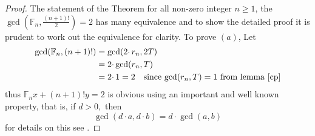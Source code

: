 \documentclass[pdflatex,sn-mathphys-num]{sn-jnl}%
\theoremstyle{thmstyleone}%
\theoremstyle{thmstyletwo}%
\theoremstyle{thmstylethree}%
\begin{document}
\begin{proof}
The statement of the Theorem for all non-zero integer $n\geq 1$, the $\gcd(\mathbb{F}_{n},\frac{(n+1)!}{2})=2$ has many equivalence and to show the detailed proof it is prudent to work out the equivalence for clarity. 
To prove $(a)$, Let 
\begin{align*}
    \gcd(\mathbb{F}_{n},(n+1)!)&=\gcd(2\cdotp r_{n},2T)\\
    &=2\cdotp \gcd(r_n, T) \\
    &=2 \cdotp 1= 2 \quad \mbox{since $\gcd(r_n, T)=1$ from lemma \ref{cp}}
\end{align*}
thus $\mathbb{F}_{n} x + (n+1)! y=2$ is obvious using an important and well known property, that is, if $d>0,$ then $$\gcd(d\cdotp a,d\cdotp b)=d\cdotp \gcd(a, b)$$ for details on this see \cite{knuth2014art}.


\end{proof}
\end{document}
